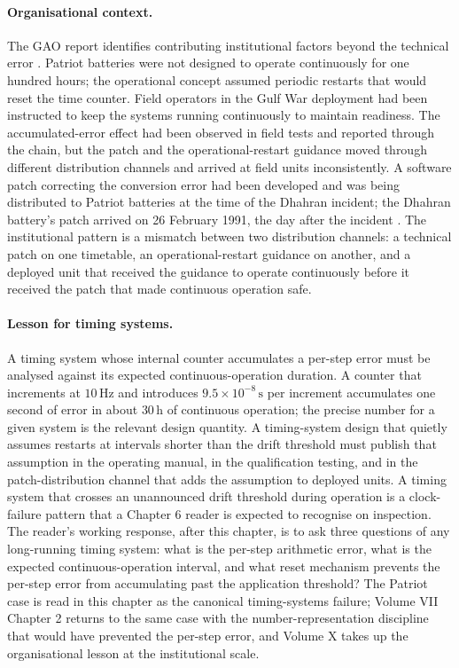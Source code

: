 

\paragraph{Organisational context.}
The GAO report identifies contributing institutional factors
beyond the technical error \cite{acc:gao-patriot-1992}. Patriot
batteries were not designed to operate continuously for one
hundred hours; the operational concept assumed periodic restarts
that would reset the time counter. Field operators in the Gulf War
deployment had been instructed to keep the systems running
continuously to maintain readiness. The accumulated-error effect
had been observed in field tests and reported through the chain,
but the patch and the operational-restart guidance moved through
different distribution channels and arrived at field units
inconsistently. A software patch correcting the conversion error
had been developed and was being distributed to Patriot batteries
at the time of the Dhahran incident; the Dhahran battery's patch
arrived on 26 February 1991, the day after the incident
\cite{acc:gao-patriot-1992}. The institutional pattern is a
mismatch between two distribution channels: a technical patch on
one timetable, an operational-restart guidance on another, and a
deployed unit that received the guidance to operate continuously
before it received the patch that made continuous operation safe.

\paragraph{Lesson for timing systems.}
A timing system whose internal counter accumulates a per-step
error must be analysed against its expected continuous-operation
duration. A counter that increments at $10 \,\si{\hertz}$ and
introduces $9.5 \times 10^{-8} \,\si{\second}$ per increment
accumulates one second of error in about $30 \,\si{\hour}$ of
continuous operation; the precise number for a given system is the
relevant design quantity. A timing-system design that quietly
assumes restarts at intervals shorter than the drift threshold
must publish that assumption in the operating manual, in the
qualification testing, and in the patch-distribution channel that
adds the assumption to deployed units. A timing system that
crosses an unannounced drift threshold during operation is a
clock-failure pattern that a Chapter 6 reader is expected to
recognise on inspection. The reader's working response, after this
chapter, is to ask three questions of any long-running timing
system: what is the per-step arithmetic error, what is the
expected continuous-operation interval, and what reset mechanism
prevents the per-step error from accumulating past the application
threshold? The Patriot case is read in this chapter as the
canonical timing-systems failure; Volume VII Chapter 2 returns to
the same case with the number-representation discipline that would
have prevented the per-step error, and Volume X takes up the
organisational lesson at the institutional scale.

